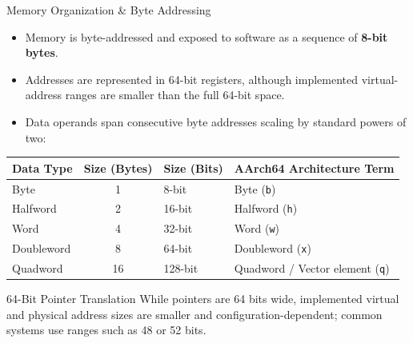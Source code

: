 \documentclass[aspectratio=169,11pt,t,xcolor=table]{beamer}
\newcommand{\key}[1]{\textbf{#1}}
\newcommand{\code}[1]{\texttt{#1}}
\begin{document}
\begin{frame}{Memory Organization \& Byte Addressing}
\vfill
\begin{itemize}\setlength{\itemsep}{3pt}
  \item Memory is byte-addressed and exposed to software as a sequence of \key{8-bit bytes}.
  \item Addresses are represented in 64-bit registers, although implemented virtual-address ranges are smaller than the full 64-bit space.
  \item Data operands span consecutive byte addresses scaling by standard powers of two:
\end{itemize}

\vfill
\begin{center}
\footnotesize
\renewcommand{\arraystretch}{1.0}
\setlength{\tabcolsep}{8pt}
\begin{tabular}{lcll}
\toprule
\textbf{Data Type} & \textbf{Size (Bytes)} & \textbf{Size (Bits)} & \textbf{AArch64 Architecture Term} \\
\midrule
\rowcolor{tablerow}
Byte         & 1  & 8-bit  & Byte (\code{b}) \\
Halfword     & 2  & 16-bit & Halfword (\code{h}) \\
\rowcolor{tablerow}
Word         & 4  & 32-bit & Word (\code{w}) \\
Doubleword   & 8  & 64-bit & Doubleword (\code{x}) \\
\rowcolor{tablerow}
Quadword     & 16 & 128-bit& Quadword / Vector element (\code{q}) \\
\bottomrule
\end{tabular}
\end{center}

\vfill
\begin{block}{64-Bit Pointer Translation}
\footnotesize While pointers are 64 bits wide, implemented virtual and physical address sizes are smaller and configuration-dependent; common systems use ranges such as 48 or 52 bits.
\end{block}
\vfill
\end{frame}









\end{document}
